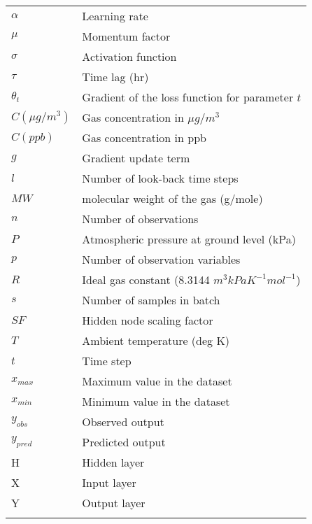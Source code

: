 \begin{longtable}{ll}
$\alpha$ & Learning rate \\
$\mu$ & Momentum factor \\
$\sigma$ & Activation function \\
$\tau$ & Time lag (hr) \\
$\theta_{t}$ & Gradient of the loss function for parameter $t$ \\
$C(\mu g/m^{3})$ & Gas concentration in $\mu g/m^{3}$ \\
$C(ppb)$ & Gas concentration in ppb \\
$g$ & Gradient update term \\
$l$ & Number of look-back time steps \\
$MW$ & molecular weight of the gas (g/mole) \\
$n$ & Number of observations \\
$P$ & Atmospheric pressure at ground level (kPa) \\
$p$ & Number of observation variables \\
$R$ & Ideal gas constant (8.3144 $m^{3}kPa K^{-1}mol^{-1}$) \\
$s$ & Number of samples in batch \\
$SF$ & Hidden node scaling factor \\
$T$ & Ambient temperature (deg K) \\
$t$ & Time step \\
$x_{max}$ & Maximum value in the dataset \\
$x_{min}$ & Minimum value in the dataset \\
$y_{obs}$ & Observed output \\
$y_{pred}$ & Predicted output \\
H & Hidden layer \\
X & Input layer \\
Y & Output layer \\

\\ \hline
\end{longtable}

\clearpage